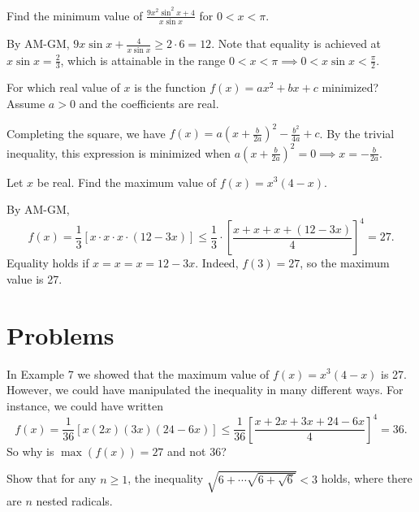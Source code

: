 \documentclass[blue,onecol]{shooting}
\begin{document}
\begin{exam}[AIME 1983/9]
Find the minimum value of $\frac{9x^2\sin^2 x + 4}{x\sin x}$ for $0 < x < \pi$.
\end{exam}
\begin{sol}
By AM-GM, $9x\sin x+\frac{4}{x\sin x}\ge 2\cdot 6=12.$ Note that equality is achieved at $x\sin x=\frac23$, which is attainable in the range $0<x<\pi\implies 0<x\sin x<\frac{\pi}2$. 
\end{sol}

\begin{exam}
For which real value of $x$ is the function $f(x)=ax^2+bx+c$ minimized? Assume $a>0$ and the coefficients are real. 
\end{exam}
\begin{sol}
Completing the square, we have $f(x)=a\left(x+\frac{b}{2a}\right)^2-\frac{b^2}{4a}+c$. By the trivial inequality, this expression is minimized when $a\left(x+\frac{b}{2a}\right)^2=0\implies x=-\frac{b}{2a}$. 
\end{sol}

\begin{exam}[WOOT]
{Let $x$ be real. Find the maximum value of $f(x)=x^3(4-x)$. }
\end{exam}
\begin{sol}
By AM-GM, \[f(x)=\frac13[x\cdot x\cdot x\cdot (12-3x)]\le \frac13\cdot \left[\frac{x+x+x+(12-3x)}4\right]^4=27.\]Equality holds if $x=x=x=12-3x$. Indeed, $f(3)=27$, so the maximum value is 27. 
\end{sol}
\pagebreak

\section{Problems}

\begin{req}[WOOT]{2}
In Example 7 we showed that the maximum value of $f(x)=x^3(4-x)$ is 27. However, we could have manipulated the inequality in many different ways. For instance, we could have written \[f(x)=\frac 1{36}[x(2x)(3x)(24-6x)]\le\frac1{36}\left[\frac{x+2x+3x+24-6x}4\right]^4=36.\] So why is $\max(f(x))=27$ and not 36?
\end{req} 

\begin{prob}[]{2}
Show that for any $n\ge1$, the inequality $\sqrt{6+\cdots \sqrt{6+\sqrt{6}}}<3$ holds, where there are $n$ nested radicals. 
\end{prob} 
\end{document}
